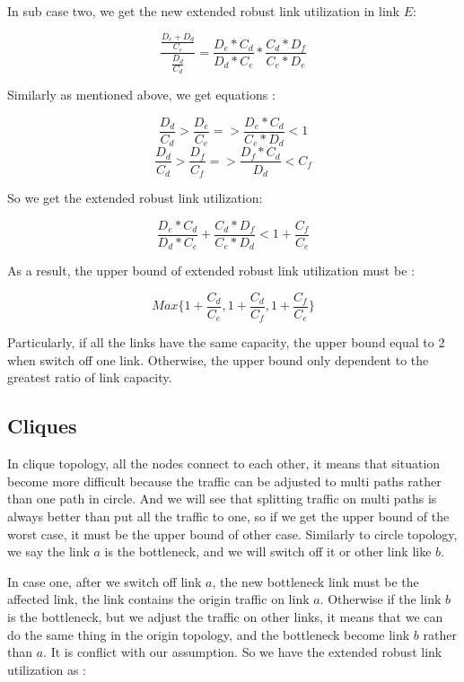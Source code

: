 \documentclass[conference]{IEEEtran}
\begin{document}
In sub case two, we get the new extended robust link utilization in link $E$:

\begin{equation}
    \frac{\frac{D_e + D_d}{C_e}}{\frac{D_d}{C_d}} = \frac{D_e * C_d}{D_d * C_e} * \frac{C_d * D_f}{C_e * D_e}
\end{equation}

Similarly as mentioned above, we get equations :

\begin{equation}
    \frac{D_d}{C_d} > \frac{D_e}{C_e} => \frac{D_e * C_d}{C_e * D_d} < 1 
\end{equation}
\begin{equation}
    \frac{D_d}{C_d} > \frac{D_f}{C_f} => \frac{D_f * C_d}{D_d} < C_f
\end{equation}

So we get the extended robust link utilization:

\begin{equation}
    \frac{D_e * C_d}{D_d * C_e} + \frac{C_d * D_f}{C_e * D_d} < 1 + \frac{C_f}{C_e}
\end{equation}

As a result, the upper bound of extended robust link utilization must be :

\begin{equation}
    Max\{1 + \frac{C_d}{C_e}, 1 + \frac{C_d}{C_f}, 1 + \frac{C_f}{C_e}\}
\end{equation}

Particularly, if all the links have the same capacity, the upper bound equal to 2 when switch off one link. Otherwise, the 
upper bound only dependent to the greatest ratio of link capacity.
 
\subsection{Cliques}
In clique topology, all the nodes connect to each other, it means that situation become more difficult because the traffic
can be adjusted to multi paths rather than one path in circle. And we will see that splitting traffic on multi paths is 
always better than put all the traffic to one, so if we get the upper bound of the worst case, it must be the upper bound
of other case. Similarly to circle topology, we say the link $a$ is the bottleneck, and we will switch off it or other link
like $b$.

In case one, after we switch off link $a$, the new bottleneck link must be the affected link, the link contains the origin 
traffic on link $a$. Otherwise if the link $b$ is the bottleneck, but we adjust the traffic on other links, it means that
we can do the same thing in the origin topology, and the bottleneck become link $b$ rather than $a$. It is conflict with our
assumption. So we have the extended robust link utilization as :
\end{document}
